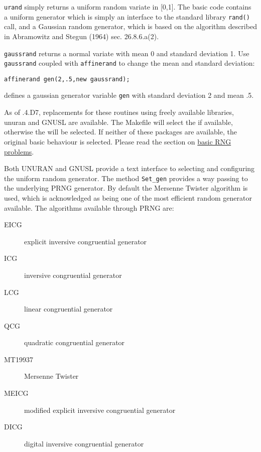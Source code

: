 \verb+urand+ simply returns a uniform random variate in [0,1]. The
basic \EcoLab{} code contains a uniform generator which is simply an
interface to the standard library \verb+rand()+ call, and a Gaussian
random generator, which is based on the algorithm described in
Abramowitz and Stegun (1964) sec. 26.8.6.a(2).

\verb+gaussrand+ returns a normal variate with mean 0 and standard
deviation 1. Use \verb+gaussrand+ coupled with \verb+affinerand+ to
change the mean and standard deviation:
\begin{verbatim}
affinerand gen(2,.5,new gaussrand);
\end{verbatim}
defines a gaussian generator variable {\tt gen} with standard
deviation 2 and mean .5.

As of \EcoLab.4.D7, replacements for these routines using freely
available libraries, unuran and GNUSL are available. The Makefile will
select the  if available,
otherwise the  will be selected. If
neither of these packages are available, the original basic behaviour
is selected. Please read the section on \hyperref{problems with the
  basic random number library}{(\S}{)}{basic RNG problems}.

Both UNURAN and GNUSL provide a text interface to selecting and
configuring the uniform random generator. The method \verb+Set_gen+
provides a way passing 
to the underlying PRNG generator. By default the Mersenne Twister
algorithm is used, which is acknowledged as being one of the most
efficient random generator available. The algorithms available
through PRNG are:

\begin{description}
\item[EICG] explicit inversive congruential generator
\item[ICG] inversive congruential generator
\item[LCG] linear congruential generator
\item[QCG] quadratic congruential generator
\item[MT19937] Mersenne Twister
\item[MEICG] modified explicit inversive congruential generator
\item[DICG] digital inversive congruential generator
\end{description}

